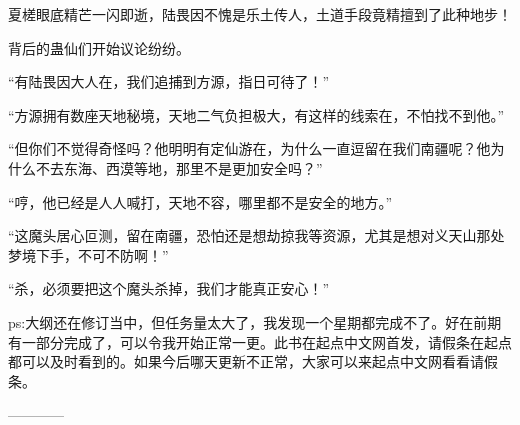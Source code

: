 \begin{this_body}
夏槎眼底精芒一闪即逝，陆畏因不愧是乐土传人，土道手段竟精擅到了此种地步！

背后的蛊仙们开始议论纷纷。

“有陆畏因大人在，我们追捕到方源，指日可待了！”

“方源拥有数座天地秘境，天地二气负担极大，有这样的线索在，不怕找不到他。”

“但你们不觉得奇怪吗？他明明有定仙游在，为什么一直逗留在我们南疆呢？他为什么不去东海、西漠等地，那里不是更加安全吗？”

“哼，他已经是人人喊打，天地不容，哪里都不是安全的地方。”

“这魔头居心叵测，留在南疆，恐怕还是想劫掠我等资源，尤其是想对义天山那处梦境下手，不可不防啊！”

“杀，必须要把这个魔头杀掉，我们才能真正安心！”

ps:大纲还在修订当中，但任务量太大了，我发现一个星期都完成不了。好在前期有一部分完成了，可以令我开始正常一更。此书在起点中文网首发，请假条在起点都可以及时看到的。如果今后哪天更新不正常，大家可以来起点中文网看看请假条。

------------

\end{this_body}

